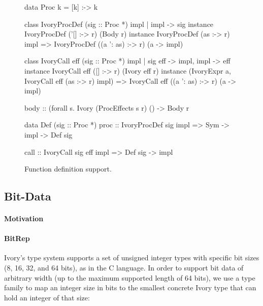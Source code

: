 \begin{figure}[h]
\begin{code}
data Proc k = [k] :-> k

class IvoryProcDef (sig :: Proc *) impl | impl -> sig
instance IvoryProcDef ('[] :-> r) (Body r)
instance IvoryProcDef (as :-> r) impl
  => IvoryProcDef ((a ': as) :-> r) (a -> impl)

class IvoryCall eff (sig :: Proc *) impl
  | sig eff -> impl, impl -> eff
instance IvoryCall eff ([] :-> r) (Ivory eff r)
instance (IvoryExpr a, IvoryCall eff (as :-> r) impl)
  => IvoryCall eff ((a ': as) :-> r) (a -> impl)

body :: (forall s. Ivory (ProcEffects s r) () -> Body r

data Def (sig :: Proc *)
proc :: IvoryProcDef sig impl
     => Sym -> impl -> Def sig

call :: IvoryCall sig eff impl => Def sig -> impl
\end{code}
\caption{Function definition support.}
\label{fig:proc-defs}
\end{figure}


\subsection{Bit-Data}
\label{sec:bitdata}

\paragraph{Motivation}

\paragraph{BitRep}
Ivory's type system supports a set of unsigned integer types with
specific bit sizes (8, 16, 32, and 64 bits), as in the C language.
In order to support bit data of arbitrary width (up to the maximum
supported length of 64 bits), we use a type family
 to map an integer size in bits to the smallest
concrete Ivory type that can hold an integer of that size:

